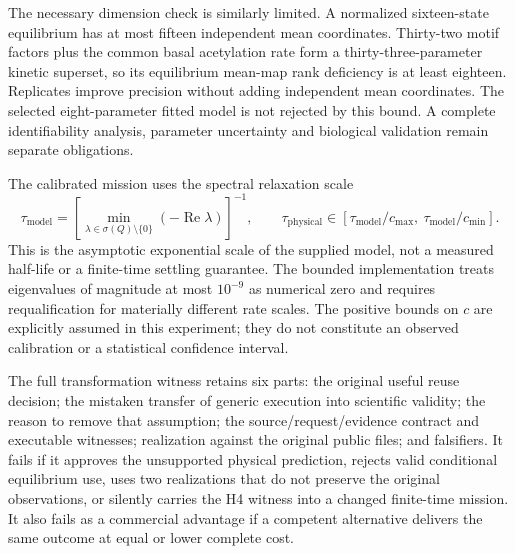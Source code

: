 The necessary dimension check is similarly limited. A normalized sixteen-state equilibrium has at most fifteen independent mean coordinates. Thirty-two motif factors plus the common basal acetylation rate form a thirty-three-parameter kinetic superset, so its equilibrium mean-map rank deficiency is at least eighteen. Replicates improve precision without adding independent mean coordinates. The selected eight-parameter fitted model is not rejected by this bound. A complete identifiability analysis, parameter uncertainty and biological validation remain separate obligations.

The calibrated mission uses the spectral relaxation scale
\[
\tau_{\mathrm{model}}=\left[\min_{\lambda\in\sigma(Q)\setminus\{0\}}(-\operatorname{Re}\lambda)\right]^{-1},\qquad
\tau_{\mathrm{physical}}\in[\tau_{\mathrm{model}}/c_{\max},\ \tau_{\mathrm{model}}/c_{\min}].
\]
This is the asymptotic exponential scale of the supplied model, not a measured half-life or a finite-time settling guarantee. The bounded implementation treats eigenvalues of magnitude at most $10^{-9}$ as numerical zero and requires requalification for materially different rate scales. The positive bounds on $c$ are explicitly assumed in this experiment; they do not constitute an observed calibration or a statistical confidence interval.

The full transformation witness retains six parts: the original useful reuse decision; the mistaken transfer of generic execution into scientific validity; the reason to remove that assumption; the source/request/evidence contract and executable witnesses; realization against the original public files; and falsifiers. It fails if it approves the unsupported physical prediction, rejects valid conditional equilibrium use, uses two realizations that do not preserve the original observations, or silently carries the H4 witness into a changed finite-time mission. It also fails as a commercial advantage if a competent alternative delivers the same outcome at equal or lower complete cost.

